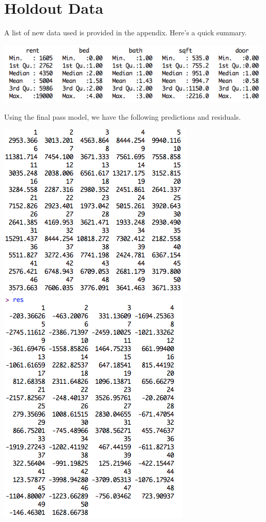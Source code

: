 \documentclass[a4 paper, 11 pt, twocolumn]{article}
\begin{document}
\section{Holdout Data}
A list of new data used is provided in the appendix. Here's a quick summary.
\begin{center}
\includegraphics[scale=0.45]{sum}
\end{center}
Using the final pass model, we have the following predictions and residuals.
\begin{center}
\includegraphics[scale=0.5]{pred}
\includegraphics[scale=0.5]{res}
\end{center}
\end{document}

